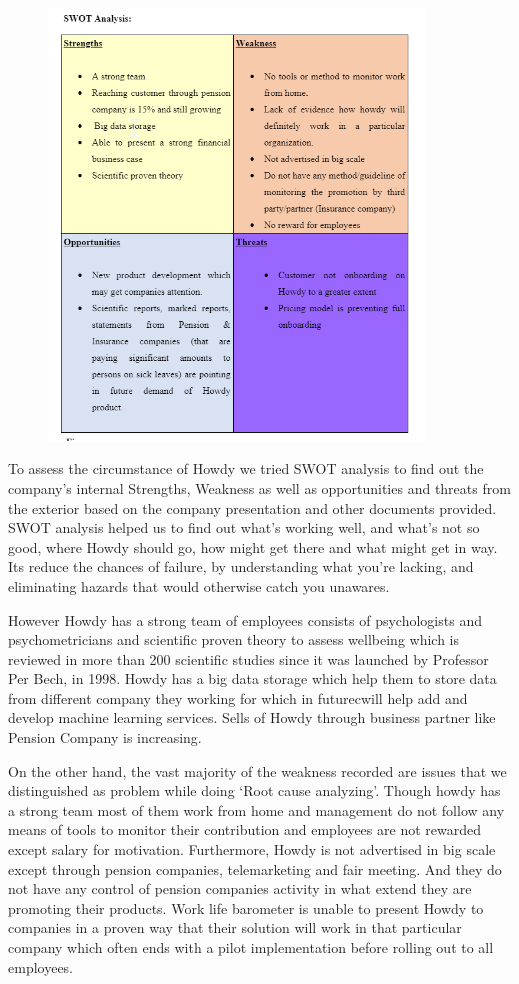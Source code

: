 \begin{figure}[H]
\includegraphics[width=10cm]{figures/SWATDRAFT.png}
\centering
\end{figure}


To assess the circumstance of Howdy we tried SWOT analysis to find out the company’s internal Strengths, Weakness as well as opportunities and threats from the exterior based on the company presentation and other documents provided. SWOT analysis helped us to find out what's working well, and what's not so good, where Howdy should go, how might get there and what might get in way. Its reduce the chances of failure, by understanding what you're lacking, and eliminating hazards that would otherwise catch you unawares.

\noindent However Howdy has a strong team of employees consists of psychologists and psychometricians and scientific proven theory to assess wellbeing which is reviewed in more than 200 scientific studies since it was launched by Professor Per Bech, in 1998. Howdy has a big data storage which help them to store data from different company they working for which in futurecwill help add and develop machine learning services. Sells of Howdy through business partner like Pension Company is increasing.

\noindent On the other hand, the vast majority of the weakness recorded are issues that we distinguished as problem while doing ‘Root cause analyzing’. Though howdy has a strong team most of them work from home and management do not follow any means of tools to monitor their contribution and employees are not rewarded except salary for motivation. Furthermore, Howdy is not advertised in big scale except through pension companies, telemarketing and fair meeting. And they do not have any control of pension companies activity in what extend they are promoting their products. Work life barometer is unable to present Howdy to companies in a proven way that their solution will work in that particular company which often ends with a pilot implementation before rolling out to all employees.

